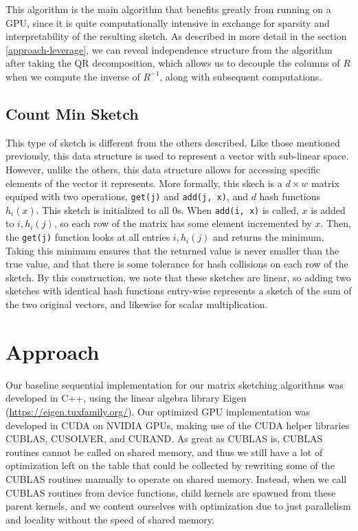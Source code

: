 \documentclass[12pt]{article}
\begin{document}
This algorithm is the main algorithm that benefits greatly from running on a GPU, since it is quite computationally intensive in exchange for sparsity and interpretability of the resulting sketch. As described in more detail in the section \ref{approach-leverage}, we can reveal independence structure from the algorithm after taking the QR decomposition, which allows us to decouple the columns of $R$ when we compute the inverse of $R^{-1}$, along with subsequent computations. 

\subsection{Count Min Sketch}
This type of sketch is different from the others described. Like those mentioned previously, this data structure is used to represent a vector with sub-linear space. However, unlike the others, this data structure allows for accessing specific elements of the vector it represents. More formally, this skech is a $d \times w$ matrix equiped with two operations, \verb|get(j)| and \verb|add(j, x)|, and $d$ hash functions $h_i (x)$. This sketch is initialized to all 0s. When \verb|add(i, x)| is called, $x$ is added to $i, h_i(j)$, so each row of the matrix has some element incremented by $x$. Then, the \verb|get(j)| function looks at all entries $i, h_i(j)$ and returns the minimum. Taking this minimum ensures that the returned value is never smaller than the true value, and that there is some tolerance for hash collisions on each row of the sketch. By this construction, we note that these sketches are linear, so adding two sketches with identical hash functions entry-wise represents a sketch of the sum of the two original vectors, and likewise for scalar multiplication.

\section{Approach}
Our baseline sequential implementation for our matrix sketching algorithms was developed in C++, using the linear algebra library Eigen (\url{https://eigen.tuxfamily.org/}). Our optimized GPU implementation was developed in CUDA on NVIDIA GPUs, making use of the CUDA helper libraries CUBLAS, CUSOLVER, and CURAND. As great as CUBLAS is, CUBLAS routines cannot be called on shared memory, and thus we still have a lot of optimization left on the table that could be collected by rewriting some of the CUBLAS routines manually to operate on shared memory. Instead, when we call CUBLAS routines from device functions, child kernels are spawned from these parent kernels, and we content ourselves with optimization due to just parallelism and locality without the speed of shared memory.
\end{document}
